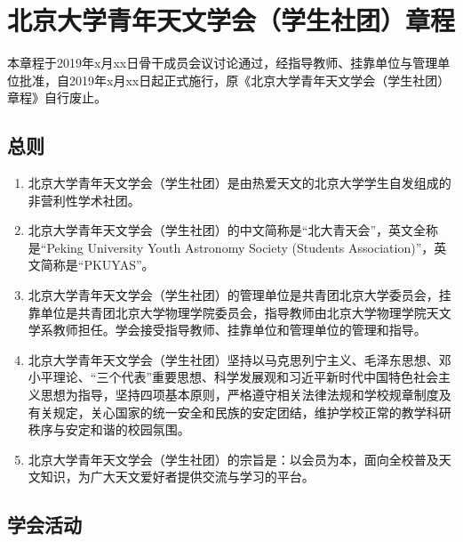 \chapter{北京大学青年天文学会（学生社团）章程}

本章程于2019年x月xx日骨干成员会议讨论通过，经指导教师、挂靠单位与管理单位批准，自2019年x月xx日起正式施行，原《北京大学青年天文学会（学生社团）章程》自行废止。

\section{总则}

\begin{enumerate}
    \item 北京大学青年天文学会（学生社团）是由热爱天文的北京大学学生自发组成的非营利性学术社团。
    
    \item 北京大学青年天文学会（学生社团）的中文简称是“北大青天会”，英文全称是“Peking University Youth Astronomy Society (Students Association)”，英文简称是“PKUYAS”。
    
    \item 北京大学青年天文学会（学生社团）的管理单位是共青团北京大学委员会，挂靠单位是共青团北京大学物理学院委员会，指导教师由北京大学物理学院天文学系教师担任。学会接受指导教师、挂靠单位和管理单位的管理和指导。
    
    \item 北京大学青年天文学会（学生社团）坚持以马克思列宁主义、毛泽东思想、邓小平理论、“三个代表”重要思想、科学发展观和习近平新时代中国特色社会主义思想为指导，坚持四项基本原则，严格遵守相关法律法规和学校规章制度及有关规定，关心国家的统一安全和民族的安定团结，维护学校正常的教学科研秩序与安定和谐的校园氛围。
    
    \item 北京大学青年天文学会（学生社团）的宗旨是：以会员为本，面向全校普及天文知识，为广大天文爱好者提供交流与学习的平台。
\end{enumerate}

\section{学会活动}

